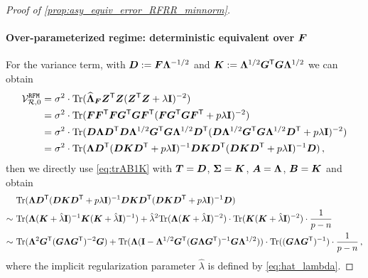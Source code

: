 \begin{proof}[Proof of \cref{prop:asy_equiv_error_RFRR_minnorm}]
\paragraph{Over-parameterized regime: deterministic equivalent over $\bF$}
For the variance term, with $\bD := \bF \bLambda^{-1/2}$ and $\bK := \bLambda^{1/2} \bG^\sT \bG \bLambda^{1/2}$ we can obtain
\[
\begin{aligned}
\mathcal{V}^{\tt RFM}_{\mathcal{R},0} &= \sigma^2 \cdot \mathrm{Tr}(\widehat{\bLambda}_{\bF} \bZ^\sT \bZ (\bZ^\sT \bZ + \lambda\id)^{-2})\\
&= \sigma^2 \cdot \mathrm{Tr}(\bF \bF^\sT \bF \bG^\sT \bG \bF^\sT (\bF \bG^\sT \bG \bF^\sT + p\lambda\id)^{-2})\\
&= \sigma^2 \cdot \mathrm{Tr}(\bD \bLambda \bD^\sT \bD \bLambda^{1/2} \bG^\sT \bG \bLambda^{1/2} \bD^\sT (\bD \bLambda^{1/2} \bG^\sT \bG \bLambda^{1/2} \bD^\sT + p\lambda\id)^{-2})\\
&= \sigma^2 \cdot \mathrm{Tr}(\bLambda \bD^\sT (\bD \bK \bD^\sT + p\lambda\id)^{-1} \bD \bK \bD^\sT (\bD \bK \bD^\sT + p\lambda\id)^{-1} \bD )\,,
\end{aligned}
\]
then we directly use \cref{eq:trAB1K} with $\bT=\bD$, $\bSigma=\bK$, $\bA=\bLambda$, $\bB=\bK$ and obtain
\[
\begin{aligned}
&~\mathrm{Tr}(\bLambda \bD^\sT (\bD \bK \bD^\sT + p\lambda\id)^{-1} \bD \bK \bD^\sT (\bD \bK \bD^\sT + p\lambda\id)^{-1} \bD )\\
\sim&~ \mathrm{Tr}(\bLambda ( \bK + \hat\lambda\id)^{-1} \bK ( \bK + \hat\lambda\id)^{-1} ) + \hat\lambda^2 \mathrm{Tr}(\bLambda ( \bK + \hat\lambda\id)^{-2} ) \cdot \mathrm{Tr}( \bK ( \bK + \hat\lambda\id)^{-2} ) \cdot \frac{1}{p-n}\\
\sim&~ \Tr(\bLambda^2 \bG^\sT (\bG \bLambda \bG^\sT)^{-2} \bG ) + \mathrm{Tr}(\bLambda ( \id - \bLambda^{1/2}\bG^\sT (\bG \bLambda \bG^\sT)^{-1} \bG \bLambda^{1/2} ) ) \cdot \mathrm{Tr}( (\bG \bLambda \bG^\sT)^{-1} ) \cdot \frac{1}{p-n}\,,
\end{aligned}
\]
where the implicit regularization parameter $\hat\lambda$ is defined by \cref{eq:hat_lambda}.


\end{proof}
